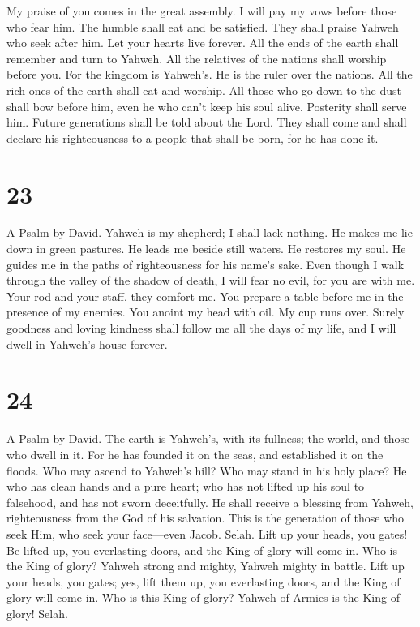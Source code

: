  My praise of you comes in the great assembly. I will pay
my vows before those who fear him.  The humble shall eat
and be satisfied. They shall praise Yahweh who seek after him. Let your
hearts live forever.  All the ends of the earth shall
remember and turn to Yahweh. All the relatives of the nations shall
worship before you.  For the kingdom is Yahweh's. He is the
ruler over the nations.  All the rich ones of the earth
shall eat and worship. All those who go down to the dust shall bow
before him, even he who can't keep his soul alive. 
Posterity shall serve him. Future generations shall be told about the
Lord.  They shall come and shall declare his righteousness
to a people that shall be born, for he has done it.

\hypertarget{section-22}{%
\section{23}\label{section-22}}

A Psalm by David.  Yahweh is my shepherd; I shall lack
nothing.  He makes me lie down in green pastures. He leads
me beside still waters.  He restores my soul. He guides me
in the paths of righteousness for his name's sake.  Even
though I walk through the valley of the shadow of death, I will fear no
evil, for you are with me. Your rod and your staff, they comfort me.
 You prepare a table before me in the presence of my
enemies. You anoint my head with oil. My cup runs over. 
Surely goodness and loving kindness shall follow me all the days of my
life, and I will dwell in Yahweh's house forever.

\hypertarget{section-23}{%
\section{24}\label{section-23}}

A Psalm by David.  The earth is Yahweh's, with its fullness;
the world, and those who dwell in it.  For he has founded it
on the seas, and established it on the floods.  Who may
ascend to Yahweh's hill? Who may stand in his holy place? 
He who has clean hands and a pure heart; who has not lifted up his soul
to falsehood, and has not sworn deceitfully.  He shall
receive a blessing from Yahweh, righteousness from the God of his
salvation.  This is the generation of those who seek Him,
who seek your face---even Jacob. Selah.  Lift up your heads,
you gates! Be lifted up, you everlasting doors, and the King of glory
will come in.  Who is the King of glory? Yahweh strong and
mighty, Yahweh mighty in battle.  Lift up your heads, you
gates; yes, lift them up, you everlasting doors, and the King of glory
will come in.  Who is this King of glory? Yahweh of Armies
is the King of glory! Selah.

